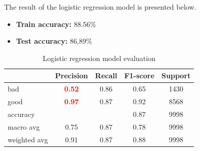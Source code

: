 The result of the logistic regression model is presented below.
\begin{itemize}
	\item \textbf{Train accuracy:} 88.56\%
	\item \textbf{Test accuracy:} 86,89\%
\end{itemize}


\begin{table}[h!]
	\centering
	\begin{tabular}{lcccc}
	\hline
				 & \multicolumn{1}{l}{\textbf{Precision}} & \multicolumn{1}{l}{\textbf{Recall}} & \multicolumn{1}{l}{\textbf{F1-score}} & \multicolumn{1}{l}{\textbf{Support}} \\ \hline
	bad          & \textcolor{red}{\textbf{0.52}}                          & 0.86                                & 0.65                                  & 1430                                 \\
	good         & \textcolor{red}{\textbf{0.97}}                          & 0.87                                & 0.92                                  & 8568                                 \\ \hline
	accuracy     &                                        &                                     & 0.87                                  & 9998                                 \\
	macro avg    & 0.75                                   & 0.87                                & 0.78                                  & 9998                                 \\
	weighted avg & 0.91                                   & 0.87                                & 0.88                                  & 9998  \\ \hline                              
	\end{tabular}
	\caption{\label{demo-table} Logistic regression model evaluation}
	\end{table}


